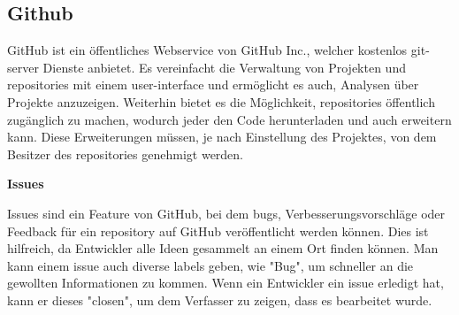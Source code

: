 \renewcommand{\kapitelautor}{Autor: Felix Zwickelstorfer}
\subsection{Github}\label{subsec:github}

GitHub ist ein öffentliches Webservice von GitHub Inc., welcher kostenlos git-server Dienste anbietet.
Es vereinfacht die Verwaltung von Projekten und repositories mit einem user-interface und ermöglicht es auch, Analysen über Projekte anzuzeigen.
Weiterhin bietet es die Möglichkeit, repositories öffentlich zugänglich zu machen, wodurch jeder den Code herunterladen und auch erweitern kann.
Diese Erweiterungen müssen, je nach Einstellung des Projektes, von dem Besitzer des repositories genehmigt werden.

\renewcommand{\kapitelautor}{Autor: Felix Zwickelstorfer}
\textbf{Issues}

Issues sind ein Feature von GitHub, bei dem bugs, Verbesserungsvorschläge oder Feedback für ein repository auf GitHub veröffentlicht werden können.
Dies ist hilfreich, da Entwickler alle Ideen gesammelt an einem Ort finden können.
Man kann einem issue auch diverse labels geben, wie \zB "Bug", um schneller an die gewollten Informationen zu kommen.
Wenn ein Entwickler ein issue erledigt hat, kann er dieses "closen", um dem Verfasser zu zeigen, dass es bearbeitet wurde.
